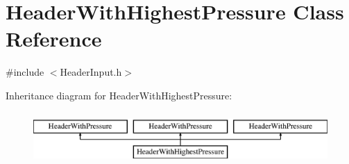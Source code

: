 \hypertarget{class_header_with_highest_pressure}{}\section{Header\+With\+Highest\+Pressure Class Reference}
\label{class_header_with_highest_pressure}


{\ttfamily \#include $<$Header\+Input.\+h$>$}

Inheritance diagram for Header\+With\+Highest\+Pressure\+:\begin{figure}[H]
\begin{center}
\leavevmode
\includegraphics[height=2.000000cm]{d0/d79/class_header_with_highest_pressure}
\end{center}
\end{figure}
